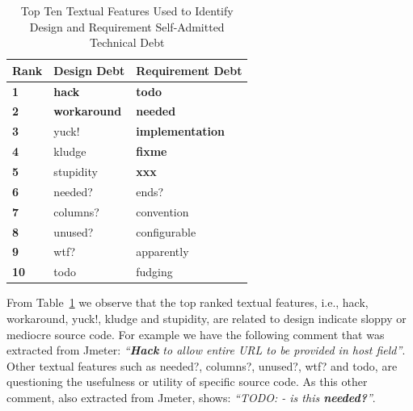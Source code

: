 \begin{table}[!thb]
    \begin{center}
        \caption{Top Ten Textual Features Used to Identify Design and Requirement Self-Admitted Technical Debt}
        \label{tbl:top_ten_features}
        \begin{tabular}{l| l l }
        \toprule
        \textbf{Rank} & \textbf{Design Debt} & \textbf{Requirement Debt}  \\
        \midrule
         \textbf{1}  & \textbf{hack}       &   \textbf{todo}     \\
         \textbf{2}  & \textbf{workaround} &   \textbf{needed}   \\
         \textbf{3}  & yuck!      &   \textbf{implementation}    \\
         \textbf{4}  & kludge     &   \textbf{fixme}             \\
         \textbf{5}  & stupidity  &   \textbf{xxx}               \\
         \textbf{6}  & needed?    &   ends?             \\
         \textbf{7}  & columns?   &   convention        \\
         \textbf{8}  & unused?    &   configurable      \\
         \textbf{9}  & wtf?       &   apparently        \\
         \textbf{10} & todo       &   fudging           \\
        \bottomrule
        \end{tabular}
    \end{center}    
\end{table}

From Table~\ref{tbl:top_ten_features} we observe that the top ranked textual features, i.e., hack, workaround, yuck!, kludge and stupidity, are related to design \SATD indicate sloppy or mediocre source code. For example we have the following comment that was extracted from Jmeter: \textit{``\textbf{Hack} to allow entire URL to be provided in host field''}. Other textual features such as needed?, columns?, unused?, wtf? and todo, are questioning the usefulness or utility of specific source code. As this other comment, also extracted from Jmeter, shows: \textit{``TODO: - is this \textbf{needed?}''}. 

